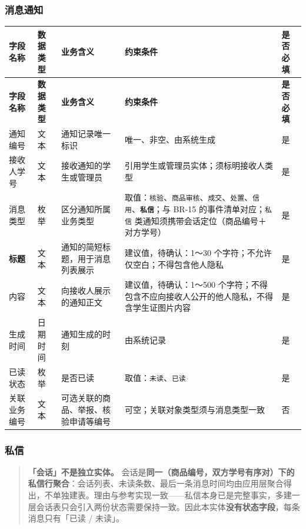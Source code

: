 \documentclass[12pt,a4paper]{ctexart}
\begin{document}
\subsubsection*{消息通知}

{\footnotesize
\begin{longtable}{|p{1.55cm}|p{1.49cm}|p{3.42cm}|p{8.05cm}|p{1.49cm}|}
\hline
\textbf{字段名称} & \textbf{数据类型} & \textbf{业务含义} & \textbf{约束条件} & \textbf{是否必填} \\
\hline
\endfirsthead
\hline
\textbf{字段名称} & \textbf{数据类型} & \textbf{业务含义} & \textbf{约束条件} & \textbf{是否必填} \\
\hline
\endhead
\hline
\endfoot
通知编号 & 文本 & 通知记录唯一标识 & 唯一、非空、由系统生成 & 是 \\
\hline
接收人学号 & 文本 & 接收通知的学生或管理员 & 引用学生或管理员实体；须标明接收人类型 & 是 \\
\hline
消息类型 & 枚举 & 区分通知所属业务类型 & 取值：\texttt{核验}、\texttt{商品审核}、\texttt{成交}、\texttt{处置}、\texttt{信用}、\textbf{\texttt{私信}}；与 BR-15 的事件清单对应；\texttt{私信} 类通知须携带会话定位（商品编号＋对方学号） & 是 \\
\hline
\textbf{标题} & 文本 & 通知的简短标题，用于消息列表展示 & 建议值，待确认：1～30 个字符；不允许仅空白；不得包含他人隐私 & 是 \\
\hline
内容 & 文本 & 向接收人展示的通知正文 & 建议值，待确认：1～500 个字符；不得包含不应向接收人公开的他人隐私，不得含学生证图片内容 & 是 \\
\hline
生成时间 & 日期时间 & 通知生成的时刻 & 由系统记录 & 是 \\
\hline
已读状态 & 枚举 & 是否已读 & 取值：\texttt{未读}、\texttt{已读} & 是 \\
\hline
关联业务编号 & 文本 & 可选关联的商品、举报、核验申请等编号 & 可空；关联对象类型须与消息类型一致 & 否 \\
\hline
\end{longtable}
}


\subsubsection*{私信}

\begin{quote}\small
\textbf{「会话」不是独立实体。} 会话是\textbf{同一（商品编号，双方学号有序对）下的私信行聚合}：会话列表、未读条数、最后一条消息时间均由应用层聚合得出，不单独建表。理由与参考实现一致——私信本身已是完整事实，多建一层会话表只会引入两份状态需要保持一致。因此本实体\textbf{没有状态字段}，每条消息只有「已读 / 未读」。

\end{quote}
\end{document}
